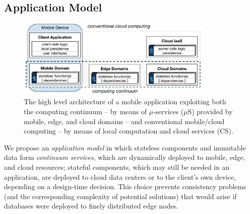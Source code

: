 




\subsection{Application Model}\label{sec:application_model}

\begin{figure}[tbp]
	\includegraphics[width=0.85\textwidth]{figs/Continuum-arch}
	\setlength{\belowcaptionskip}{-10pt}
	\caption{The high level architecture of a mobile application exploiting both the computing continuum -- by means of $\mu$-services ($\mu$S) provided by mobile, edge, and cloud domains -- and conventional mobile/cloud computing -- by means of local computation and cloud services (CS).}
	\label{fig:Continuum-arch}
\end{figure}


We propose an \textit{application model} in which stateless components and immutable data form \textit{continuum services}, which are dynamically deployed to mobile, edge, and cloud resources; stateful components, which may still be needed in an application, are deployed to cloud data centers or to the client's own device, depending on a design-time decision. This choice prevents consistency problems (and the corresponding complexity of potential solutions) that would arise if databases were deployed to finely distributed edge nodes.


